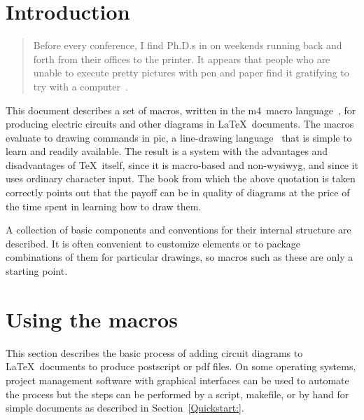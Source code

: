 \newcommand{\bq}{}
\newcommand{\pic}{{\bq pic}}
\newcommand{\dvips}{{\bq dvips}}
\newcommand{\Pic}{{\bq Pic}}
\newcommand{\gpic}{{\bq gpic}}
\newcommand{\Gpic}{{\bq Gpic}}
\newcommand{\Dpic}{{\bq Dpic}}
\newcommand{\tpic}{{\bq tpic}}
\newcommand{\mfpic}{{\bq mfpic}}
\newcommand{\groff}{{\bq groff}}
\newcommand{\xfig}{{\bq xfig}}
\newcommand{\Xfig}{{\bq Xfig}}
\newcommand{\PSTricks}{{\bq PSTricks}}
\newcommand{\MetaPost}{{\bq MetaPost}}
\newcommand{\Postscript}{{\bq Postscript}}
\newcommand{\dpic}{{\bq dpic}}
\newcommand{\Mfour}{{\bq m4}}
\newcommand{\TPGF}{{\bq Ti{\it k}z~PGF}}
\newcommand{\SVG}{{\bq SVG}}
\newcommand{\xection}[1]{\section[#1\ \dotfill]{#1}}
\newcommand{\NVL}{\\\hspace*{\parindent}}
%
  \tableofcontents
\enlargethispage{\baselineskip}
%
\xection{Introduction}
   \begin{quotation}\noindent
   Before every conference, I find Ph.D.s in on weekends running back
   and forth from their offices to the printer.  It appears that people
   who are unable to execute pretty pictures with pen and paper find it
   gratifying to try with a computer~\cite{Landauer95}.
   \end{quotation}

This document describes a set of macros, written in the \Mfour\ macro
language~\cite{KRm4}, for producing electric circuits and other
diagrams in \LaTeX\ documents.  The macros evaluate to drawing commands
in \pic, a line-drawing language~\cite{KRpic} that is simple to learn
and readily available.  The result is a system with the
advantages and disadvantages of \TeX\ itself, since it is macro-based
and non-wysiwyg, and since it uses ordinary character input.  The book
from which the above quotation is taken correctly points out that the
payoff can be in quality of diagrams at the price of the time spent in
learning how to draw them.

A collection of basic components and conventions for their internal
structure are described.  It is often convenient to customize elements
or to package combinations of them for particular drawings, so macros
such as these are only a starting point.

\xection{Using the macros}
This section describes the basic process of adding circuit diagrams to
\LaTeX\ documents to produce postscript or pdf files.  On some operating
systems, project management software with graphical interfaces can be used
to automate the process but the steps can be performed by a script,
makefile, or by hand for simple documents as described in
Section~\ref{Quickstart:}.

